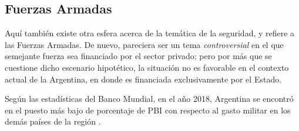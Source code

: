 \documentclass[12pt,a4paper,twoside]{book}
\begin{document}
\subsection{Fuerzas Armadas}
Aquí también existe otra esfera acerca de la temática de la seguridad, y refiere a las Fuerzas Armadas. De nuevo, pareciera ser un tema \textit{controversial} en el que semejante fuerza sea financiado por el sector privado; pero por más que se cuestione dicho escenario hipotético, la situación no es favorable en el contexto actual de la Argentina, en donde es financiada exclusivamente por el Estado.

Según las estadísticas del Banco Mundial, en el año 2018, Argentina se encontró en el puesto más bajo de porcentaje de PBI con respecto al gasto militar en los demás países de la región \cite{bancomundial:gastomilitarARG}.
\end{document}
